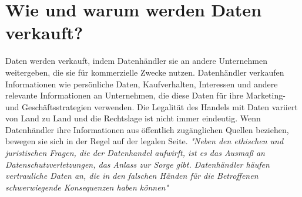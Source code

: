 \section{Wie und warum werden Daten verkauft?}

Daten werden verkauft, indem Datenhändler sie an andere Unternehmen weitergeben, die sie für kommerzielle Zwecke nutzen. Datenhändler verkaufen Informationen wie persönliche Daten, Kaufverhalten, Interessen und andere relevante Informationen an Unternehmen, die diese Daten für ihre Marketing- und Geschäftsstrategien verwenden. Die Legalität des Handels mit Daten variiert von Land zu Land und die Rechtslage ist nicht immer eindeutig. Wenn Datenhändler ihre Informationen aus öffentlich zugänglichen Quellen beziehen, bewegen sie sich in der Regel auf der legalen Seite. \textit{"Neben den ethischen und juristischen Fragen, die der Datenhandel aufwirft, ist es das Ausmaß an Datenschutzverletzungen, das Anlass zur Sorge gibt. Datenhändler häufen vertrauliche Daten an, die in den falschen Händen für die Betroffenen schwerwiegende Konsequenzen haben können" }